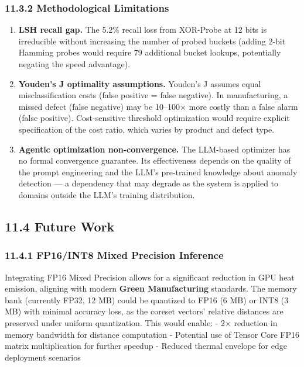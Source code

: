 \subsubsection{11.3.2 Methodological Limitations}\label{methodological-limitations}

\begin{enumerate}
\def\labelenumi{\arabic{enumi}.}
\item
  \textbf{LSH recall gap.} The 5.2\% recall loss from XOR-Probe at 12 bits is irreducible without increasing the number of probed buckets (adding 2-bit Hamming probes would require 79 additional bucket lookups, potentially negating the speed advantage).
\item
  \textbf{Youden's J optimality assumptions.} Youden's J assumes equal misclassification costs (false positive = false negative). In manufacturing, a missed defect (false negative) may be 10--100× more costly than a false alarm (false positive). Cost-sensitive threshold optimization would require explicit specification of the cost ratio, which varies by product and defect type.
\item
  \textbf{Agentic optimization non-convergence.} The LLM-based optimizer has no formal convergence guarantee. Its effectiveness depends on the quality of the prompt engineering and the LLM's pre-trained knowledge about anomaly detection --- a dependency that may degrade as the system is applied to domains outside the LLM's training distribution.
\end{enumerate}

\subsection{11.4 Future Work}\label{future-work}

\subsubsection{11.4.1 FP16/INT8 Mixed Precision Inference}\label{fp16int8-mixed-precision-inference}

Integrating FP16 Mixed Precision allows for a significant reduction in GPU heat emission, aligning with modern \textbf{Green Manufacturing} standards. The memory bank (currently FP32, 12 MB) could be quantized to FP16 (6 MB) or INT8 (3 MB) with minimal accuracy loss, as the coreset vectors' relative distances are preserved under uniform quantization. This would enable: - 2× reduction in memory bandwidth for distance computation - Potential use of Tensor Core FP16 matrix multiplication for further speedup - Reduced thermal envelope for edge deployment scenarios

